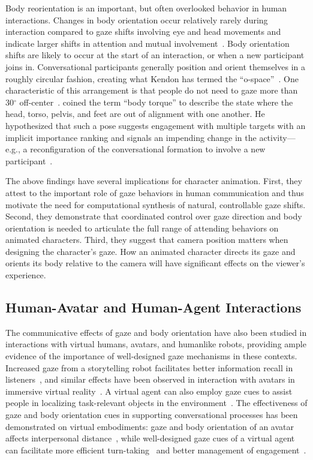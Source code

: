 Body reorientation is an important, but often overlooked behavior in human interactions. Changes in body orientation occur relatively rarely during interaction compared to gaze shifts involving eye and head movements and indicate larger shifts in attention and mutual involvement~\citep{kendon1990conducting,schegloff1998bodytorque}.
Body orientation shifts are likely to occur at the start of an interaction, or when a new participant joins in. Conversational participants generally position and orient themselves in a roughly circular fashion, creating what Kendon has termed the ``o-space''~\citep{kendon1990conducting}. One characteristic of this arrangement is that people do not need to gaze more than 30$^{\circ}$ off-center~\citep{kendon1990conducting}. \citet{schegloff1998bodytorque} coined the term ``body torque'' to describe the state where the head, torso, pelvis, and feet are out of alignment with one another. He hypothesized that such a pose suggests engagement with multiple targets with an implicit importance ranking and signals an impending change in the activity---e.g., a reconfiguration of the conversational formation to involve a new participant~\citep{kendon1990conducting}.

The above findings have several implications for character animation. First, they attest to the important role of gaze behaviors in human communication and thus motivate the need for computational synthesis of natural, controllable gaze shifts. Second, they demonstrate that coordinated control over gaze direction and body orientation is needed to articulate the full range of attending behaviors on animated characters. Third, they suggest that camera position matters when designing the character's gaze. How an animated character directs its gaze and orients its body relative to the camera will have significant effects on the viewer's experience.

\subsection{Human-Avatar and Human-Agent Interactions}

The communicative effects of gaze and body orientation have also been studied in interactions with virtual humans, avatars, and humanlike robots, providing ample evidence of the importance of well-designed gaze mechanisms in these contexts. Increased gaze from a storytelling robot facilitates better information recall in listeners~\citep{mutlu2006storytelling}, and similar effects have been observed in interaction with avatars in immersive virtual reality~\citep{bailenson2005transformed}. A virtual agent can also employ gaze cues to assist people in localizing task-relevant objects in the environment~\citep{bailly2010gaze}. The effectiveness of gaze and body orientation cues in supporting conversational processes has been demonstrated on virtual embodiments: gaze and body orientation of an avatar affects interpersonal distance~\citep{bailenson2003interpersonal}, while well-designed gaze cues of a virtual agent can facilitate more efficient turn-taking~\citep{heylen2005experimenting,andrist2013aversion,bohus2011multiparty} and better management of engagement~\citep{bohus2009models}.

